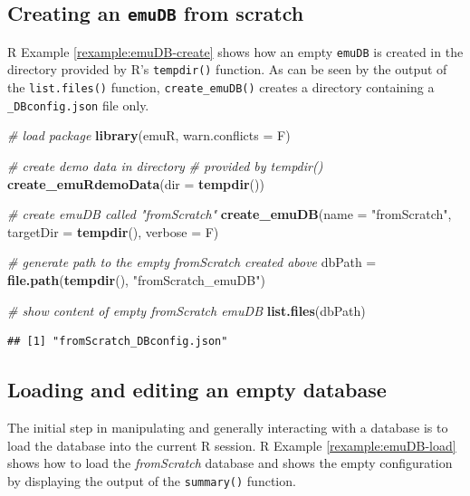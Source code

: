 \documentclass[]{book}
\newenvironment{Shaded}{\begin{snugshade}}{\end{snugshade}}
\newcommand{\CommentTok}[1]{\textcolor[rgb]{0.56,0.35,0.01}{\textit{#1}}}
\newcommand{\DataTypeTok}[1]{\textcolor[rgb]{0.13,0.29,0.53}{#1}}
\newcommand{\KeywordTok}[1]{\textcolor[rgb]{0.13,0.29,0.53}{\textbf{#1}}}
\newcommand{\NormalTok}[1]{#1}
\newcommand{\StringTok}[1]{\textcolor[rgb]{0.31,0.60,0.02}{#1}}
\theoremstyle{definition}
\theoremstyle{definition}
\theoremstyle{definition}
\theoremstyle{remark}
\begin{document}
\hypertarget{creating-an-emudb-from-scratch}{%
\subsection{\texorpdfstring{Creating an \texttt{emuDB} from
scratch}{Creating an emuDB from scratch}}\label{creating-an-emudb-from-scratch}}

R Example \ref{rexample:emuDB-create} shows how an empty \texttt{emuDB}
is created in the directory provided by R's \texttt{tempdir()} function.
As can be seen by the output of the \texttt{list.files()} function,
\texttt{create\_emuDB()} creates a directory containing a
\texttt{\_DBconfig.json} file only.

\begin{Shaded}
\begin{Highlighting}[]
\CommentTok{# load package}
\KeywordTok{library}\NormalTok{(emuR, }\DataTypeTok{warn.conflicts =}\NormalTok{ F)}

\CommentTok{# create demo data in directory }
\CommentTok{# provided by tempdir()}
\KeywordTok{create_emuRdemoData}\NormalTok{(}\DataTypeTok{dir =} \KeywordTok{tempdir}\NormalTok{())}

\CommentTok{# create emuDB called "fromScratch"}
\KeywordTok{create_emuDB}\NormalTok{(}\DataTypeTok{name =} \StringTok{"fromScratch"}\NormalTok{,}
             \DataTypeTok{targetDir =} \KeywordTok{tempdir}\NormalTok{(),}
             \DataTypeTok{verbose =}\NormalTok{ F)}

\CommentTok{# generate path to the empty fromScratch created above}
\NormalTok{dbPath =}\StringTok{ }\KeywordTok{file.path}\NormalTok{(}\KeywordTok{tempdir}\NormalTok{(), }\StringTok{"fromScratch_emuDB"}\NormalTok{)}

\CommentTok{# show content of empty fromScratch emuDB}
\KeywordTok{list.files}\NormalTok{(dbPath)}
\end{Highlighting}
\end{Shaded}

\begin{verbatim}
## [1] "fromScratch_DBconfig.json"
\end{verbatim}

\hypertarget{loading-and-editing-an-empty-database}{%
\subsection{Loading and editing an empty
database}\label{loading-and-editing-an-empty-database}}

The initial step in manipulating and generally interacting with a
database is to load the database into the current R session. R Example
\ref{rexample:emuDB-load} shows how to load the \emph{fromScratch}
database and shows the empty configuration by displaying the output of
the \texttt{summary()} function.
\end{document}
